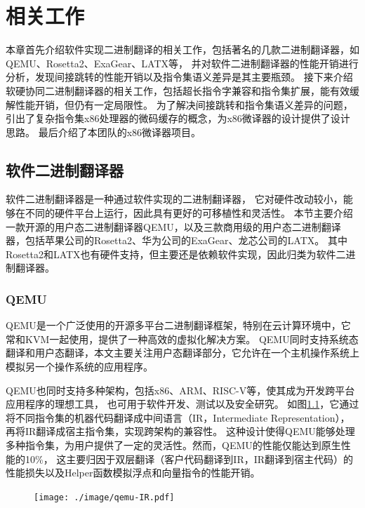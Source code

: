 \chapter{相关工作}\label{chap:related_work}

本章首先介绍软件实现二进制翻译的相关工作，包括著名的几款二进制翻译器，如QEMU、Rosetta2、ExaGear、LATX等，
并对软件二进制翻译器的性能开销进行分析，发现间接跳转的性能开销以及指令集语义差异是其主要瓶颈。
接下来介绍软硬协同二进制翻译器的相关工作，包括超长指令字兼容和指令集扩展，能有效缓解性能开销，但仍有一定局限性。
为了解决间接跳转和指令集语义差异的问题，引出了复杂指令集x86处理器的微码缓存的概念，为x86微译器的设计提供了设计思路。
最后介绍了本团队的x86微译器项目。

\section{软件二进制翻译器}

软件二进制翻译器是一种通过软件实现的二进制翻译器，
它对硬件改动较小，能够在不同的硬件平台上运行，因此具有更好的可移植性和灵活性。
本节主要介绍一款开源的用户态二进制翻译器QEMU，以及三款商用级的用户态二进制翻译器，包括苹果公司的Rosetta2、华为公司的ExaGear、龙芯公司的LATX。
其中Rosetta2和LATX也有硬件支持，但主要还是依赖软件实现，因此归类为软件二进制翻译器。

\subsection{QEMU}

QEMU是一个广泛使用的开源多平台二进制翻译框架，特别在云计算环境中，它常和KVM一起使用，提供了一种高效的虚拟化解决方案。
QEMU同时支持系统态翻译和用户态翻译，本文主要关注用户态翻译部分，它允许在一个主机操作系统上模拟另一个操作系统的应用程序。

QEMU也同时支持多种架构，包括x86、ARM、RISC-V等，使其成为开发跨平台应用程序的理想工具， 也可用于软件开发、测试以及安全研究。
如图\ref{img:qemu_arch}，它通过将不同指令集的机器代码翻译成中间语言（IR，Intermediate Representation），再将IR翻译成宿主指令集，实现跨架构的兼容性。
这种设计使得QEMU能够处理多种指令集，为用户提供了一定的灵活性。然而，QEMU的性能仅能达到原生性能的10\%，
这主要归因于双层翻译（客户代码翻译到IR，IR翻译到宿主代码）的性能损失以及Helper函数模拟浮点和向量指令的性能开销\cite{deflater}。

\begin{figure}[!htbp]
  \centering
  \texttt{[image: ./image/qemu-IR.pdf]}
  \label{img:qemu_arch}
\end{figure}

